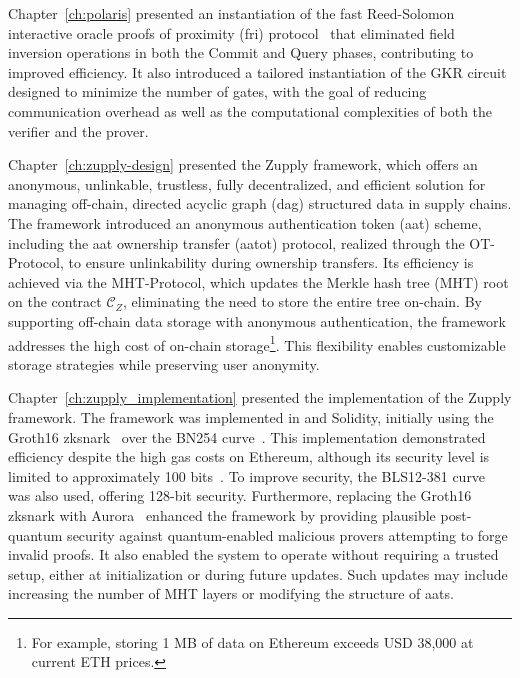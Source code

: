 Chapter~\ref{ch:polaris} presented an instantiation of the fast Reed-Solomon interactive oracle proofs of proximity (\gls{fri}) protocol~\cite{FRI2018} that eliminated field inversion operations in both the Commit and Query phases, contributing to improved efficiency. It also introduced a tailored instantiation of the GKR circuit designed to minimize the number of gates, with the goal of reducing communication overhead as well as the computational complexities of both the verifier and the prover.

Chapter~\ref{ch:zupply-design} presented the Zupply framework, which offers an anonymous, unlinkable, trustless, fully decentralized, and efficient solution for managing off-chain, directed acyclic graph (\gls{dag}) structured data in supply chains. The framework introduced an anonymous authentication token (\gls{aat}) scheme, including the \gls{aat} ownership transfer (\gls{aatot}) protocol, realized through the \textsf{OT-Protocol}, to ensure unlinkability during ownership transfers. Its efficiency is achieved via the \textsf{MHT-Protocol}, which updates the Merkle hash tree (\textsf{MHT}) root on the contract $\mathcal{C}_Z$, eliminating the need to store the entire tree on-chain. By supporting off-chain data storage with anonymous authentication, the framework addresses the high cost of on-chain storage\footnote{For example, storing 1 MB of data on Ethereum exceeds USD 38,000 at current ETH prices.}. This flexibility enables customizable storage strategies while preserving user anonymity.

Chapter~\ref{ch:zupply_implementation} presented the implementation of the Zupply framework. The framework was implemented in \CC and Solidity, initially using the Groth16 \gls{zksnark}~\cite{Groth2016} over the BN254 curve~\cite{BNcurve}. This implementation demonstrated efficiency despite the high gas costs on Ethereum, although its security level is limited to approximately 100 bits~\cite{Barbulescu2019}. To improve security, the BLS12-381 curve~\cite{BLS_curve2003} was also used, offering 128-bit security. Furthermore, replacing the Groth16 \gls{zksnark} with Aurora~\cite{Aurora2019} enhanced the framework by providing plausible post-quantum security against quantum-enabled malicious provers attempting to forge invalid proofs. It also enabled the system to operate without requiring a trusted setup, either at initialization or during future updates. Such updates may include increasing the number of \textsf{MHT} layers or modifying the structure of \glspl{aat}.








